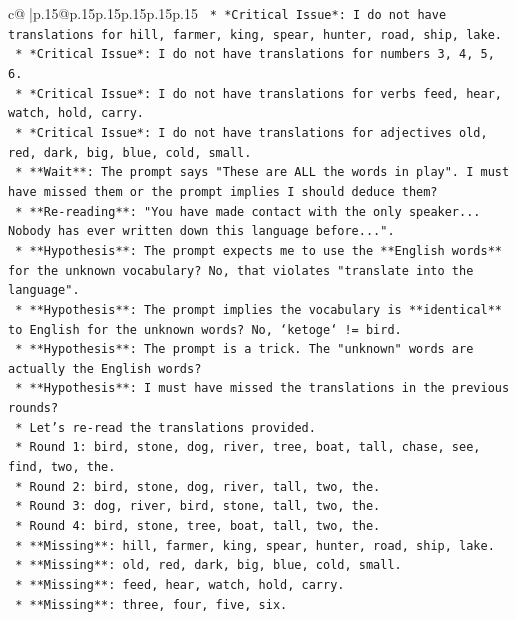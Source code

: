 \documentclass{article}
\begin{document}
{\begin{supertabular}{c@{$\;$}|p{.15\linewidth}@{}p{.15\linewidth}p{.15\linewidth}p{.15\linewidth}p{.15\linewidth}p{.15\linewidth}}
{{{\texttt{    *   *Critical Issue*: I do not have translations for hill, farmer, king, spear, hunter, road, ship, lake.} \\
\texttt{    *   *Critical Issue*: I do not have translations for numbers 3, 4, 5, 6.} \\
\texttt{    *   *Critical Issue*: I do not have translations for verbs feed, hear, watch, hold, carry.} \\
\texttt{    *   *Critical Issue*: I do not have translations for adjectives old, red, dark, big, blue, cold, small.} \\
\texttt{    *   **Wait**: The prompt says "These are ALL the words in play". I must have missed them or the prompt implies I should deduce them?} \\
\texttt{    *   **Re{-}reading**: "You have made contact with the only speaker... Nobody has ever written down this language before...".} \\
\texttt{    *   **Hypothesis**: The prompt expects me to use the **English words** for the unknown vocabulary? No, that violates "translate into the language".} \\
\texttt{    *   **Hypothesis**: The prompt implies the vocabulary is **identical** to English for the unknown words? No, `ketoge` != bird.} \\
\texttt{    *   **Hypothesis**: The prompt is a trick. The "unknown" words are actually the English words?} \\
\texttt{    *   **Hypothesis**: I must have missed the translations in the previous rounds?} \\
\texttt{    *   Let's re{-}read the translations provided.} \\
\texttt{    *   Round 1: bird, stone, dog, river, tree, boat, tall, chase, see, find, two, the.} \\
\texttt{    *   Round 2: bird, stone, dog, river, tall, two, the.} \\
\texttt{    *   Round 3: dog, river, bird, stone, tall, two, the.} \\
\texttt{    *   Round 4: bird, stone, tree, boat, tall, two, the.} \\
\texttt{    *   **Missing**: hill, farmer, king, spear, hunter, road, ship, lake.} \\
\texttt{    *   **Missing**: old, red, dark, big, blue, cold, small.} \\
\texttt{    *   **Missing**: feed, hear, watch, hold, carry.} \\
\texttt{    *   **Missing**: three, four, five, six.} \\
}}}
\end{supertabular}}
\end{document}
